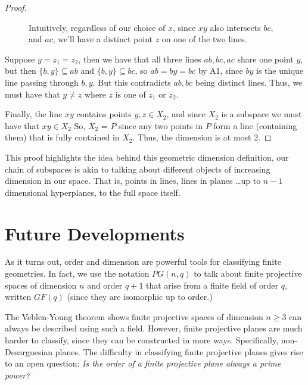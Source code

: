 \documentclass[12pt]{article}
\begin{document}
\begin{proof}
\begin{figure}[h]
            \caption{Intuitively, regardless of our choice of $x$, since $xy$ also intersects $bc$, and $ac$, we'll have a distinct point $z$ on one of the two lines.}
        \end{figure}

        Suppose $y = z_1 = z_2$, then we have that all three lines $ab,bc,ac$ share one point $y$,
        but then $\{b, y\} \subseteq ab$ and $\{b, y\} \subseteq bc$, so $ab = by = bc$ by A1,
        since $by$ is the unique line passing through $b, y$.
        But this contradicts $ab, bc$ being distinct lines.
        Thus, we must have that $y \neq z$ where $z$ is one of $z_1$ or $z_2$.

        Finally, the line $xy$ contains points $y,z \in X_2$, and since $X_2$ is a subspace we must have that $xy \in X_2$
        So, $X_2$ = $P$ since any two points in $P$ form a line (containing them) that is fully contained in $X_2$.
        Thus, the dimension is at most 2.
    \end{proof}

    This proof highlights the idea behind this geometric dimension definition,
    our chain of subspaces is akin to talking about different objects of increasing dimension in our space.
    That is, points in lines, lines in planes \ldots up to $n-1$ dimensional hyperplanes, to the full space itself.

    \section{Future Developments}

    As it turns out, order and dimension are powerful tools for classifying finite geometries.
    In fact, we use the notation $PG(n, q)$ to talk about finite projective spaces of dimension $n$ and order $q+1$
    that arise from a finite field of order $q$, written $GF(q)$ (since they are isomorphic up to order.)\cite[p.~xv]{hirschfeld_general_2016}

    The Veblen-Young theorem shows finite projective spaces of dimension $n \geq 3$ can always be described using such a field.
    However, finite projective planes are much harder to classify, since they can be constructed in more ways.
    Specifically, non-Desarguesian planes.
    The difficulty in classifying finite projective planes gives rise to an open question:
    \textit{Is the order of a finite projective plane always a prime power?}
\end{document}
